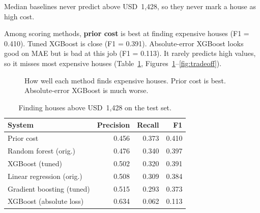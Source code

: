 \documentclass[11pt,a4paper]{article}
\begin{document}
Median baselines never predict above USD~1{,}428, so they never mark a house as high cost.

Among scoring methods, \textbf{prior cost} is best at finding expensive houses (F1 = 0.410). Tuned XGBoost is close (F1 = 0.391). Absolute-error XGBoost looks good on MAE but is bad at this job (F1 = 0.113). It rarely predicts high values, so it misses most expensive houses (Table~\ref{tab:hc}, Figures~\ref{fig:f1}--\ref{fig:tradeoff}).

\begin{figure}[ht]
\centering
{}
\caption{How well each method finds expensive houses. Prior cost is best. Absolute-error XGBoost is much worse.}
\label{fig:f1}
\end{figure}

\begin{table}[ht]
\centering
\caption{Finding houses above USD~1{,}428 on the test set.}
\label{tab:hc}
\begin{tabular}{@{}lrrr@{}}
\toprule
System & Precision & Recall & F1 \\
\midrule
Prior cost & 0.456 & 0.373 & 0.410 \\
Random forest (orig.) & 0.476 & 0.340 & 0.397 \\
XGBoost (tuned) & 0.502 & 0.320 & 0.391 \\
Linear regression (orig.) & 0.508 & 0.309 & 0.384 \\
Gradient boosting (tuned) & 0.515 & 0.293 & 0.373 \\
XGBoost (absolute loss) & 0.634 & 0.062 & 0.113 \\
\bottomrule
\end{tabular}
\end{table}
\end{document}
